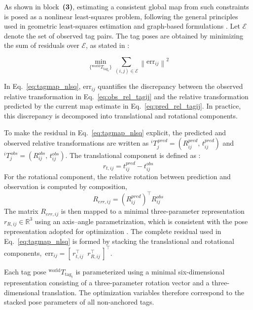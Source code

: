 \documentclass[a4paper,11pt]{article}
\begin{document}
As shown in block~\textbf{(3)}, estimating a consistent global map from such constraints is posed as a nonlinear least-squares problem, following the general principles used in geometric least-squares estimation and graph-based formulations \cite{triggs1999ba,grisetti2010tutorial}. Let $\mathcal{E}$ denote the set of observed tag pairs. The tag poses are obtained by minimizing the sum of residuals over $\mathcal{E}$, as stated in :

\begin{equation}
	\min_{\{{}^{\text{world}}\!T_{\text{tag}_i}\}}
	\sum_{(i,j)\in \mathcal{E}}
	\left\|
	\mathrm{err}_{ij}
	\right\|^2 
	\label{eq:tagmap_nlsq}
\end{equation}

In Eq.~\eqref{eq:tagmap_nlsq}, $\mathrm{err}_{ij}$ quantifies the discrepancy between the observed relative transformation in Eq.~\eqref{eq:obs_rel_tagij} and the relative transformation predicted by the current map estimate in Eq.~\eqref{eq:pred_rel_tagij}. In practice, this discrepancy is decomposed into translational and rotational components.

To make the residual in Eq.~\eqref{eq:tagmap_nlsq} explicit, the predicted and observed relative transformations are written as
${}^{i}\!T_{j}^{\,pred} = (R_{ij}^{pred},\, t_{ij}^{pred})$ and
${}^{i}\!T_{j}^{\,obs}  = (R_{ij}^{obs},\,  t_{ij}^{obs})$.
The translational component is defined as :
\begin{equation}
	r_{t,ij} = t_{ij}^{pred} - t_{ij}^{obs}
	\label{eq:residual_translation}
\end{equation}
For the rotational component, the relative rotation between prediction and observation is computed by composition,
\begin{equation}
	R_{err,ij} = \left(R_{ij}^{pred}\right)^{\top} R_{ij}^{obs}
	\label{eq:rotation_error_comp}
\end{equation}
The matrix $R_{err,ij}$ is then mapped to a minimal three-parameter representation $r_{R,ij}\in\mathbb{R}^{3}$ using an axis--angle parametrization, which is consistent with the pose representation adopted for optimization \cite{barfoot2017state}. The complete residual used in Eq.~\eqref{eq:tagmap_nlsq} is formed by stacking the translational and rotational components, $\,\mathrm{err}_{ij} = [\,r_{t,ij}^{\top}\;\; r_{R,ij}^{\top}\,]^{\top}$.

Each tag pose ${}^{\text{world}}\!T_{\text{tag}_i}$ is parameterized using a minimal six-dimensional representation consisting of a three-parameter rotation vector and a three-dimensional translation. The optimization variables therefore correspond to the stacked pose parameters of all non-anchored tags.
\end{document}
